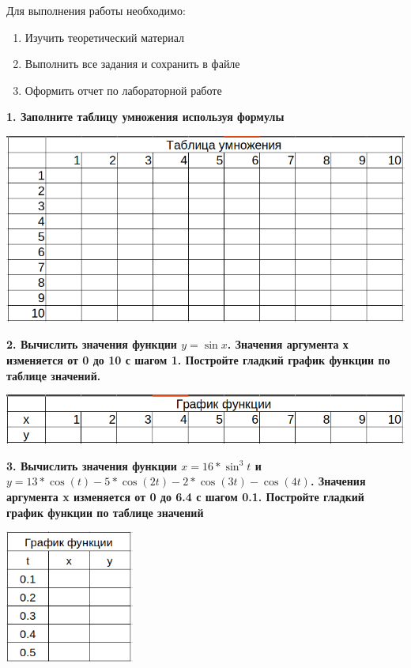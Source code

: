 Для выполнения работы необходимо:
\begin{enumerate}
  \item Изучить теоретический материал
  \item Выполнить все задания и сохранить в файле
  \item Оформить отчет по лабораторной работе
\end{enumerate}

\noindent\textbf{1. Заполните таблицу умножения используя формулы}

\includegraphics[width=\textwidth]{t1.png}

\noindent\textbf{2. Вычислить значения функции $y=\sin x$. Значения аргумента х изменяется от 0 до 10 с шагом 1. Постройте гладкий  график функции по таблице значений.}

\includegraphics[width=\textwidth]{t2.png}

\noindent\textbf{3. Вычислить значения функции $x=16 * \sin^{3}t$ и $y = 13 * \cos(t) - 5 * \cos(2t) - 2 * \cos(3t) - \cos(4t)$. Значения аргумента x изменяется  от 0 до 6.4 с шагом 0.1. Постройте гладкий график функции по таблице значений}

\begin{center}
  \includegraphics[width=120pt]{excel.png}
\end{center}
\newpage

